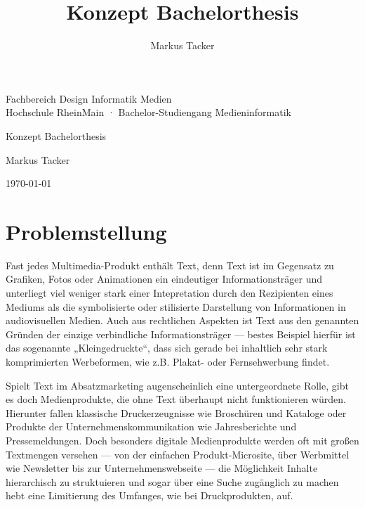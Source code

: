 \documentclass[11pt,a4paper]{article}
\begin{document}
\author{Markus Tacker}
\title{Konzept Bachelorthesis}

\begin{center}

\begin{small}Fachbereich Design Informatik Medien\\Hochschule RheinMain · Bachelor-Studiengang Medieninformatik\end{small}

\bigskip

\begin{huge}Konzept Bachelorthesis\end{huge}

\bigskip

\begin{large}Markus Tacker\end{large}

\begin{small}\today\end{small}

\end{center}

\section*{Problemstellung}

Fast jedes Multimedia-Produkt enthält Text, denn Text ist im Gegensatz zu Grafiken, Fotos oder Animationen ein eindeutiger Informationsträger und unterliegt viel weniger stark einer Intepretation durch den Rezipienten eines Mediums als die symbolisierte oder stilisierte Darstellung von Informationen in audiovisuellen Medien. Auch aus rechtlichen Aspekten ist Text aus den genannten Gründen der einzige verbindliche Informationsträger --- bestes Beispiel hierfür ist das sogenannte „Kleingedruckte“, dass sich gerade bei inhaltlich sehr stark komprimierten Werbeformen, wie z.B. Plakat- oder Fernsehwerbung findet.

Spielt Text im Absatzmarketing augenscheinlich eine untergeordnete Rolle, gibt es doch Medienprodukte, die ohne Text überhaupt nicht funktionieren würden. Hierunter fallen klassische Druckerzeugnisse wie Broschüren und Kataloge oder Produkte der Unternehmenskommunikation wie Jahresberichte und Pressemeldungen. Doch besonders digitale Medienprodukte werden oft mit großen Textmengen versehen --- von der einfachen Produkt-Microsite, über Werbmittel wie Newsletter bis zur Unternehmenswebseite --- die Möglichkeit Inhalte hierarchisch zu struktuieren und sogar über eine Suche zugänglich zu machen hebt eine Limitierung des Umfanges, wie bei Druckprodukten, auf. 
\end{document}
